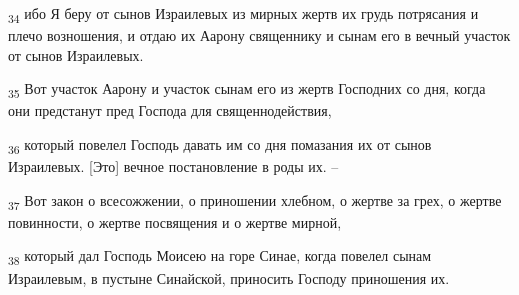 \begin{tcolorbox}
\textsubscript{34} ибо Я беру от сынов Израилевых из мирных жертв их грудь потрясания и плечо возношения, и отдаю их Аарону священнику и сынам его в вечный участок от сынов Израилевых.
\end{tcolorbox}
\begin{tcolorbox}
\textsubscript{35} Вот участок Аарону и участок сынам его из жертв Господних со дня, когда они предстанут пред Господа для священнодействия,
\end{tcolorbox}
\begin{tcolorbox}
\textsubscript{36} который повелел Господь давать им со дня помазания их от сынов Израилевых. [Это] вечное постановление в роды их. --
\end{tcolorbox}
\begin{tcolorbox}
\textsubscript{37} Вот закон о всесожжении, о приношении хлебном, о жертве за грех, о жертве повинности, о жертве посвящения и о жертве мирной,
\end{tcolorbox}
\begin{tcolorbox}
\textsubscript{38} который дал Господь Моисею на горе Синае, когда повелел сынам Израилевым, в пустыне Синайской, приносить Господу приношения их.
\end{tcolorbox}

